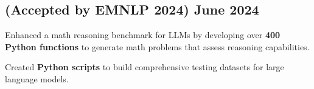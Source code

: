
\subsection{\texorpdfstring{(Accepted by EMNLP 2024) \hfill June 2024}{Accepted by EMNLP 2024, June 2024}}
\begin{zitemize}
    \item Enhanced a math reasoning benchmark for LLMs by developing over \textbf{400 Python functions} to generate math problems that assess reasoning capabilities.
    \item Created \textbf{Python scripts} to build comprehensive testing datasets for large language models.
\end{zitemize}


 
